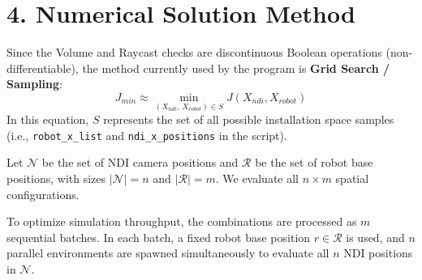 \documentclass[12pt, a4paper]{article}
\begin{document}
\section*{4. Numerical Solution Method}
Since the Volume and Raycast checks are discontinuous Boolean operations (non-differentiable), the method currently used by the program is \textbf{Grid Search / Sampling}:
\begin{equation}
    J_{min} \approx \min_{(X_{ndi}, \, X_{robot}) \in S} J(X_{ndi}, X_{robot})
\end{equation}
In this equation, $S$ represents the set of all possible installation space samples (i.e., \texttt{robot\_x\_list} and \texttt{ndi\_x\_positions} in the script). %

Let $\mathcal{N}$ be the set of NDI camera positions and $\mathcal{R}$ be the set of robot base positions, with sizes $|\mathcal{N}| = n$ and $|\mathcal{R}| = m$. We evaluate all $n \times m$ spatial configurations.

To optimize simulation throughput, the combinations are processed as $m$ sequential batches. In each batch, a fixed robot base position $r \in \mathcal{R}$ is used, and $n$ parallel environments are spawned simultaneously to evaluate all $n$ NDI positions in $\mathcal{N}$.
\end{document}
